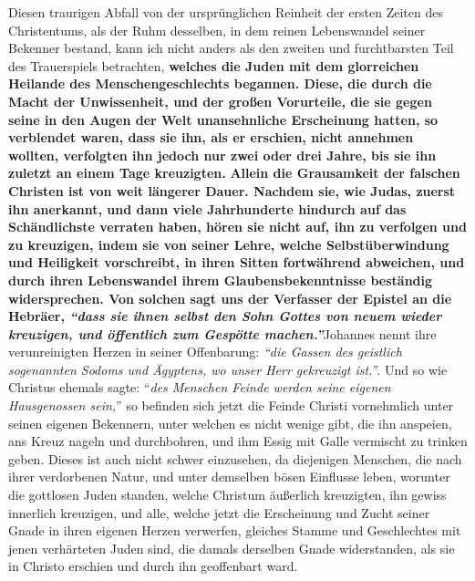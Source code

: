 Diesen traurigen Abfall von der ursprünglichen Reinheit der ersten Zeiten des
Christentums, als der Ruhm desselben, in dem reinen Lebenswandel seiner
Bekenner bestand, kann ich nicht anders als den zweiten und furchtbarsten Teil
des Trauerspiels betrachten,
\label{ref:01_04_zweite_kreuzigung}
\textbf{welches die Juden  mit dem
glorreichen Heilande des Menschengeschlechts begannen. Diese, die durch die
Macht der Unwissenheit, und der großen Vorurteile, die sie gegen seine in den
Augen der Welt unansehnliche Erscheinung hatten, so verblendet waren, dass sie
ihn, als er erschien, nicht annehmen wollten, verfolgten ihn jedoch nur zwei
oder drei Jahre, bis sie ihn zuletzt an einem Tage kreuzigten.}
\textbf{Allein die Grausamkeit der falschen Christen ist von weit längerer
Dauer. Nachdem sie, wie Judas, zuerst ihn anerkannt, und
dann viele Jahrhunderte hindurch auf das Schändlichste verraten haben, hören
sie nicht auf, ihn zu verfolgen und zu kreuzigen, indem sie von seiner Lehre,
welche Selbstüberwindung und Heiligkeit vorschreibt, in ihren Sitten fortwährend
abweichen, und durch ihren Lebenswandel ihrem Glaubensbekenntnisse beständig
widersprechen. Von solchen sagt uns der Verfasser der Epistel an die Hebräer,
\textit{"`dass sie ihnen selbst den Sohn Gottes von neuem wieder kreuzigen, und
öffentlich zum Gespötte machen."'}}Johannes nennt ihre verunreinigten Herzen in seiner Offenbarung:
\textit{"`die Gassen des geistlich sogenannten Sodoms und Ägyptens, wo unser Herr gekreuzigt ist."'}.
Und so wie Christus ehemals sagte: "`\textit{des
Menschen Feinde werden seine eigenen Hausgenossen sein,}"'
so befinden sich jetzt die Feinde Christi vornehmlich unter seinen
eigenen Bekennern, unter welchen es nicht wenige gibt, die ihn anspeien, ans
Kreuz nageln und durchbohren, und ihm Essig mit Galle vermischt zu trinken
geben.
Dieses ist auch nicht schwer einzusehen, da
diejenigen Menschen, die nach ihrer verdorbenen Natur, und unter demselben bösen
Einflusse leben, worunter die gottlosen Juden standen, welche Christum äußerlich
kreuzigten, ihn gewiss innerlich kreuzigen, und alle, welche jetzt die
Erscheinung und Zucht seiner Gnade in ihren eigenen Herzen verwerfen, gleiches
Stamme und Geschlechtes mit jenen verhärteten Juden sind, die damals derselben
Gnade widerstanden, als sie in Christo erschien und durch ihn geoffenbart
ward.

